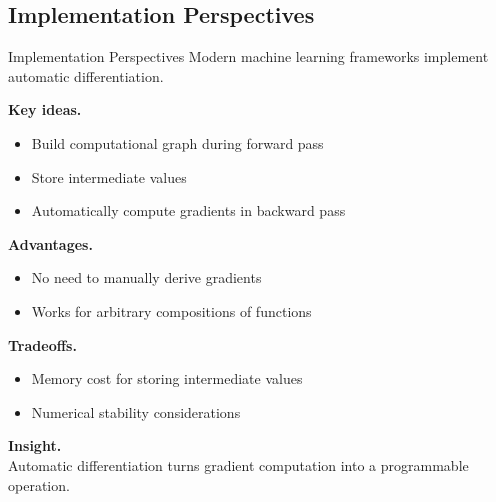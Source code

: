 \documentclass[aspectratio=169,11pt]{beamer}
\begin{document}
\subsection{Implementation Perspectives}
\begin{frame}[t,allowframebreaks]{Implementation Perspectives}
\small
Modern machine learning frameworks implement automatic differentiation.

\textbf{Key ideas.}\\ \begin{itemize}
    \item Build computational graph during forward pass
    \item Store intermediate values
    \item Automatically compute gradients in backward pass
\end{itemize}

\textbf{Advantages.}\\ \begin{itemize}
    \item No need to manually derive gradients
    \item Works for arbitrary compositions of functions
\end{itemize}

\textbf{Tradeoffs.}\\ \begin{itemize}
    \item Memory cost for storing intermediate values
    \item Numerical stability considerations
\end{itemize}

\textbf{Insight.}\\ Automatic differentiation turns gradient computation into a programmable operation.
\end{frame}
\end{document}
